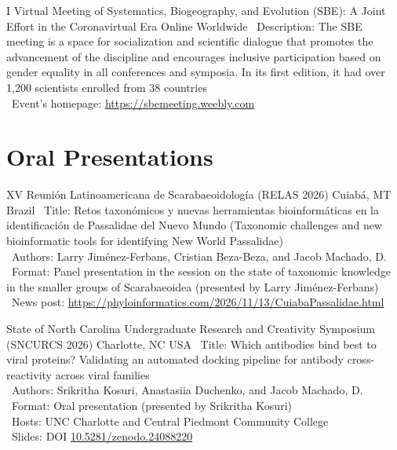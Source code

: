 \documentclass[11pt, letterpaper, sans]{moderncv}
\begin{document}
	{I Virtual Meeting of Systematics, Biogeography, and Evolution (SBE): A Joint Effort in the Coronavirtual Era}
	{Online}
	{Worldwide}
	{}
	{
		\textbullet~Description: The SBE meeting is a space for socialization and scientific dialogue that promotes the advancement of the discipline and encourages inclusive participation based on gender equality in all conferences and symposia. In its first edition, it had over 1,200 scientists enrolled from 38 countries\\
		\textbullet~Event's homepage: \url{https://sbemeeting.weebly.com}
	}


\section{Oral Presentations}

    {XV Reunión Latinoamericana de Scarabaeoidología (RELAS 2026)}
    {Cuiabá, MT}
    {Brazil}
    {}
    {
        \textbullet~Title: Retos taxonómicos y nuevas herramientas bioinformáticas en la identificación de Passalidae del Nuevo Mundo (Taxonomic challenges and new bioinformatic tools for identifying New World Passalidae)\\
        \textbullet~Authors: Larry Jiménez-Ferbans, Cristian Beza-Beza, and Jacob Machado, D.\\
        \textbullet~Format: Panel presentation in the session on the state of taxonomic knowledge in the smaller groups of Scarabaeoidea (presented by Larry Jiménez-Ferbans)\\
        \textbullet~News post: \url{https://phyloinformatics.com/2026/11/13/CuiabaPassalidae.html}
    }

    {State of North Carolina Undergraduate Research and Creativity Symposium (SNCURCS 2026)}
    {Charlotte, NC}
    {USA}
    {}
    {
        \textbullet~Title: Which antibodies bind best to viral proteins? Validating an automated docking pipeline for antibody cross-reactivity across viral families\\
        \textbullet~Authors: Srikritha Kosuri, Anastasiia Duchenko, and Jacob Machado, D.\\
        \textbullet~Format: Oral presentation (presented by Srikritha Kosuri)\\
        \textbullet~Hosts: UNC Charlotte and Central Piedmont Community College\\
        \textbullet~Slides: DOI \href{https://doi.org/10.5281/zenodo.24088220}{10.5281/zenodo.24088220}
    }
\end{document}
